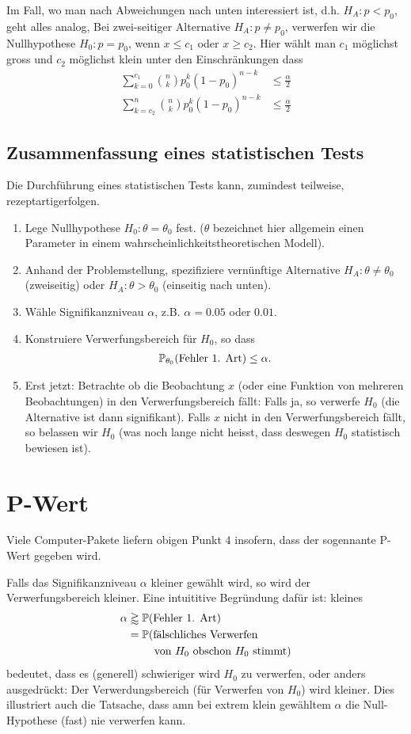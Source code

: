 Im Fall, wo man nach Abweichungen nach unten interessiert ist, d.h. $H_A: p<p_0$, geht alles analog, Bei zwei-seitiger Alternative $H_A:p\neq p_0$, verwerfen wir die Nullhypothese $H_0:p=p_0$, wenn $x\leq c_1$ oder $x\geq c_2$. Hier wählt man $c_1$ möglichst gross und $c_2$ möglichst klein unter den Einschränkungen dass
\begin{align*}
	\sum_{k=0}^{c_1}{n\choose k}p_{0}^{k}(1-p_0)^{n-k}&\leq \frac{\alpha}{2}\\
	\sum_{k=c_2}^{n}{n\choose k}p_{0}^{k}(1-p_0)^{n-k}&\leq \frac{\alpha}{2}
\end{align*}
\subsection{Zusammenfassung eines statistischen Tests}
Die Durchführung eines statistischen Tests kann, zumindest teilweise, \glqq rezeptartig\grqq erfolgen.
\begin{enumerate}[1.]
	\item Lege Nullhypothese $H_0: \theta=\theta_0$ fest. ($\theta$ bezeichnet hier allgemein einen Parameter in einem wahrscheinlichkeitstheoretischen Modell).
	\item Anhand der Problemstellung, spezifiziere vernünftige Alternative $H_A:\theta\neq \theta_0$ (zweiseitig) oder $H_A:\theta> \theta_0$ (einseitig nach unten).
	\item Wähle Signifikanzniveau $\alpha$, z.B. $\alpha=0.05$ oder $0.01$.
	\item Konstruiere Verwerfungsbereich für $H_0$, so dass 
		\begin{gather*}
			\mathbb P_{\theta_0}(\text{Fehler 1. Art})\leq \alpha.
		\end{gather*}
	\item Erst jetzt: Betrachte ob die Beobachtung $x$ (oder eine Funktion von mehreren Beobachtungen) in den Verwerfungsbereich fällt: Falls ja, so verwerfe $H_0$ (die Alternative ist dann \glqq signifikant\grqq). Falls $x$ nicht in den Verwerfungsbereich fällt, so belassen wir $H_0$ (was noch lange nicht heisst, dass deswegen $H_0$ statistisch bewiesen ist).
\end{enumerate}
\section{P-Wert}
Viele Computer-Pakete liefern obigen Punkt 4 insofern, dass der sogennante P-Wert gegeben wird.

Falls das Signifikanzniveau $\alpha$ kleiner gewählt wird, so wird der Verwerfungsbereich kleiner. Eine intuititive Begründung dafür ist: kleines
\begin{align*}
	\alpha&\gtrapprox \p(\text{Fehler 1. Art})\\
	&=\p(\text{fälschliches Verwerfen} \\
	&\hphantom{=\p()} \text{von $H_0$ obschon $H_0$ stimmt})
\end{align*}
bedeutet, dass es (generell) schwieriger wird $H_0$ zu verwerfen, oder anders ausgedrückt: Der Verwerdungsbereich (für Verwerfen von $H_0$) wird kleiner. Dies illustriert auch die Tatsache, dass amn bei extrem klein gewähltem $\alpha$ die Null-Hypothese (fast) nie verwerfen kann.

